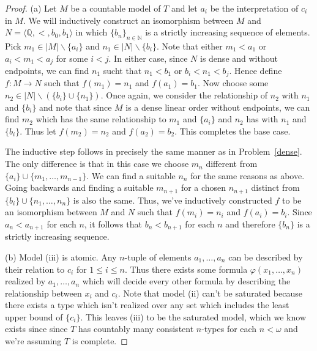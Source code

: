 \documentclass{article}
\begin{document}
\begin{proof}
(a) Let $M$ be a countable model of $T$ and let $a_i$ be the interpretation of $c_i$ in $M$. We will inductively construct an isomorphism between $M$ and $N = \langle \mathbb{Q}, < , b_0, b_1 \rangle$ in which $\{b_n\}_{n \in \mathbb{N}}$ is a strictly increasing sequence of elements. Pick $m_1 \in |M| \backslash \{a_i\}$ and $n_1 \in |N| \backslash \{b_i\}$. Note that either $m_1 < a_1$ or $a_i < m_1 < a_j$ for some $i < j$. In either case, since $N$ is dense and without endpoints, we can find $n_1$ sucht that $n_1 < b_1$ or $b_i < n_1 < b_j$. Hence define $f : M \to N$ such that $f(m_1) = n_1$ and $f(a_1) = b_1$. Now choose some $n_2 \in |N| \backslash (\{b_i\} \cup \{n_1\})$. Once again, we consider the relationship of $n_2$ with $n_1$ and $\{b_i\}$ and note that since $M$ is a dense linear order without endpoints, we can find $m_2$ which has the same relationship to $m_1$ and $\{a_i\}$ and $n_2$ has with $n_1$ and $\{b_i\}$. Thus let $f(m_2) = n_2$ and $f(a_2) = b_2$. This completes the base case.

The inductive step follows in precisely the same manner as in Problem~\ref{dense}. The only difference is that in this case we choose $m_n$ different from $\{a_i\} \cup \{m_1, \dots , m_{n-1}\}$. We can find a suitable $n_n$ for the same reasons as above. Going backwards and finding a suitable $m_{n+1}$ for a chosen $n_{n+1}$ distinct from $\{b_i\} \cup \{n_1, \dots , n_n\}$ is also the same. Thus, we've inductively constructed $f$ to be an isomorphism between $M$ and $N$ such that $f(m_i) = n_i$ and $f(a_i) = b_i$. Since $a_n < a_{n+1}$ for each $n$, it follows that $b_n < b_{n+1}$ for each $n$ and therefore $\{b_n\}$ is a strictly increasing sequence.

(b) Model (iii) is atomic. Any $n$-tuple of elements $a_1, \dots , a_n$ can be described by their relation to $c_i$ for $1 \leq i \leq n$. Thus there exists some formula $\varphi (x_1, \dots , x_n)$ realized by $a_1, \dots , a_n$ which will decide every other formula by describing the relationship between $x_i$ and $c_i$. Note that model (ii) can't be saturated because there exists a type which isn't realized over any set which includes the least upper bound of $\{c_i\}$. This leaves (iii) to be the saturated model, which we know exists since since $T$ has countably many consistent $n$-types for each $n < \omega$ and we're assuming $T$ is complete.
\end{proof}
\end{document}

